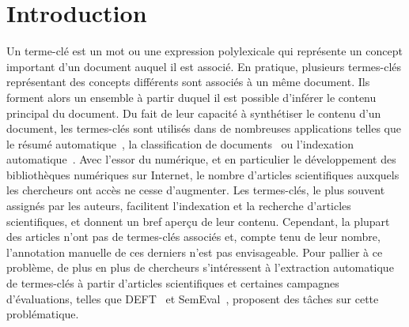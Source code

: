 \section{Introduction}
\label{sec:introduction}
  Un terme-clé est un mot ou une expression polylexicale qui représente un
  concept important d'un document auquel il est associé. En pratique, plusieurs
  termes-clés représentant des concepts différents sont associés à un même
  document. Ils forment alors un ensemble à partir duquel il est
  possible d'inférer le contenu principal du document. Du fait de leur capacité
  à synthétiser le contenu d'un document, les termes-clés sont utilisés dans
  de nombreuses applications telles que le résumé
  automatique~\cite{avanzo2005keyphrase}, la classification de
  documents~\cite{han2007webdocumentclustering} ou l'indexation
  automatique~\cite{medelyan2008smalltrainingset}.
  Avec l'essor du numérique, et en particulier le développement des bibliothèques numériques sur Internet, le nombre d'articles scientifiques auxquels les chercheurs ont accès ne cesse d'augmenter.
  Les termes-clés, le plus souvent assignés par les auteurs, facilitent l'indexation et la recherche d'articles scientifiques, et donnent un bref aperçu de leur contenu.
  Cependant, la plupart des articles n'ont pas de termes-clés associés et, compte tenu de leur nombre, l'annotation manuelle de ces derniers n'est pas envisageable.
  Pour pallier à ce problème, de plus en plus de chercheurs s'intéressent à l'extraction automatique de termes-clés à partir d'articles scientifiques et certaines campagnes d'évaluations, telles que DEFT~\cite{paroubek2012deft} et SemEval~\cite{kim2010semeval}, proposent des tâches sur cette problématique.

